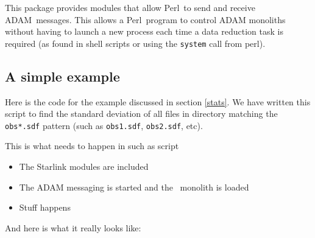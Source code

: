 \documentclass[twoside,11pt]{article}
\newcommand{\Kappa}{\xref{{\sc{Kappa}}}{sun95}{}}
\newcommand{\ADAM}{\xref{{ADAM}}{sun144}{}}
\newcommand{\perl}{\xref{\textsf{Perl}}{sun193}{}}
\newcommand{\xref}[3]{#1}
\renewcommand{\_}{\texttt{\symbol{95}}}
\begin{document}
This package provides modules that allow \perl\ to send and receive \ADAM\
messages. This allows a \perl\ program to control ADAM monoliths without having
to launch a new process each time a data reduction task is required (as found
in \xref{shell scripts}{sc4}{} or using the \texttt{system} call from perl).


\subsection{A simple example}

Here is the code for the example discussed in section \ref{stats}. We have
written this script to find the standard deviation of all files in directory
matching the \texttt{obs*.sdf} pattern (such as \texttt{obs1.sdf},
\texttt{obs2.sdf}, etc).

This is what needs to happen in such as script

\begin{itemize} 

\item The Starlink modules are included

\item The ADAM messaging is started and the \Kappa\ monolith is loaded

\item Stuff happens

\end{itemize}

And here is what it really looks like:
\end{document}
